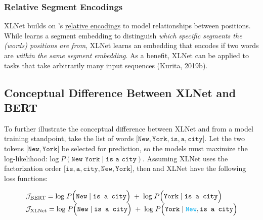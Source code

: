 

\subsubsection{Relative Segment Encodings}\label{sec:RelativeSegmentEncodings}

XLNet builds on 's \hyperref[sec:RelativePosEnc]{relative encodings} to model relationships between positions. While  learns a segment embedding to distinguish \emph{which specific segments the (words) positions are from}, XLNet learns an embedding that encodes if two words are \emph{within the same segment embedding}. As a benefit, XLNet can be applied to tasks that take arbitrarily many input sequences (Kurita, 2019b).


\subsection{Conceptual Difference Between XLNet and BERT}

To further illustrate the conceptual difference between XLNet and  from a model training standpoint, take the list of words $\Big[ \texttt{New}, \texttt{York}, \texttt{is}, \texttt{a}, \texttt{city} \Big]$. Let the two tokens $\Big[ \texttt{New}, \texttt{York} \Big]$ be selected for prediction, so the models must maximize the log-likelihood: $\text{log} \; P(\texttt{New York} \; | \; \texttt{is a city})$. Assuming XLNet uses the factorization order $\Big[ \texttt{is}, \texttt{a}, \texttt{city}, \texttt{New}, \texttt{York} \Big]$, then  and XLNet have the following loss functions: 

\begin{equation}
\begin{array}{ll}
\mathcal{J}_\text{BERT} = \text{log} \; P \Big( \texttt{New} \; | \; \texttt{is a city} \Big) \; + \; \text{log} \; P \Big( \texttt{York} \; | \; \texttt{is a city} \Big) \\
\mathcal{J}_\text{XLNet} = \text{log} \; P \Big( \texttt{New} \; | \; \texttt{is a city} \Big) \; + \; \text{log} \; P \Big( \texttt{York} \; | \; {\color{cyan} \texttt{New}}, \texttt{is a city} \Big) 
\end{array}
\label{eq:XLnetVsBERTLogLiks}
\end{equation}


